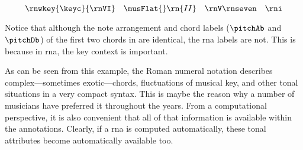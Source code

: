\begin{equation}
    \label{eq:succession2}
    \rnwkey{\keyc}{\rnVI} \quad \musFlat{}\rn{II} \quad \rnV\rnseven \quad \rni
\end{equation}

Notice that although the note arrangement and chord labels
($\pitchAb$ and $\pitchDb$) of the first two chords in
 are identical, the
\gls{rna} labels are not. This is because in \gls{rna}, the
key context is important.

As can be seen from this example, the Roman numeral notation
describes complex---sometimes exotic---chords, fluctuations
of musical key, and other tonal situations in a very compact
syntax. This is maybe the reason why a number of musicians
have preferred it throughout the years. From a computational
perspective, it is also convenient that all of that
information is available within the annotations. Clearly, if
a \gls{rna} is computed automatically, these tonal
attributes become automatically available too.
